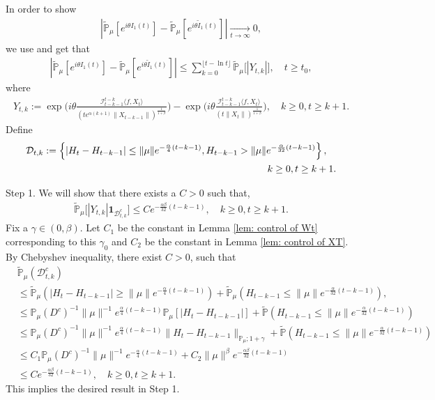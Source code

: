 \documentclass[12pt]{amsart}
\theoremstyle{plain}
\theoremstyle{definition}
\numberwithin{equation}{section}
\begin{document}
    In order to show
\begin{align}
    |\mathbb{\tilde{P}}_{\mu}[e^{i\theta I_1(t)}]-\mathbb{\tilde{P}}_{\mu}[e^{i\theta\tilde{I}_1(t)}]|
    \xrightarrow[t\to \infty]{} 0,
\end{align}
	we use \cite[Lemma 3.4.3.]{Durrett2010Probability} and get that
\begin{align}\label{ineq: control of I1t}
    |\mathbb{\tilde{P}}_{\mu}[e^{i\theta I_1(t)}] - \mathbb{\tilde{P}}_{\mu} [e^{i\theta\tilde{I}_1(t)}]|
    \leq \sum_{k=0}^{\lfloor t-\ln t \rfloor}\mathbb{\tilde{P}}_{\mu}\big[|Y_{t,k}|\big],
    \quad t\geq t_0,
\end{align}
    where
\begin{align*}
    Y_{t,k}
    :=\exp\Big(i\theta\frac{\mathcal I_{t-k-1}^{t-k}\langle f ,X_t\rangle}{(t e^{\alpha(k+1)}\|X_{t-k-1}\|)^{\frac{1}{1+\beta}}}\Big)-\exp\Big(i\theta\frac{\mathcal I_{t-k-1}^{t-k}\langle f ,X_t\rangle}{(t\|X_t\|)^{\frac{1}{1+\beta}}}\Big),
    \quad k \geq 0 , t\geq k+1.
\end{align*}
    Define
\begin{align}
\label{def: Dtk}
    \mathcal{D}_{t,k}&:=\left\{|H_t-H_{t-k-1}|\leq \|\mu\| e^{-\frac{\alpha}{4}(t-k-1)}, H_{t-k-1}>\|\mu\|e^{-\frac{\alpha}{32}(t-k-1)}\right\},
    \\ &&\mathllap{ k\geq 0, t\geq k+1.}
\end{align}

    Step 1. We will show that there exists a $C>0$ such that,
\begin{align}
\label{thm121}
    \mathbb{\tilde{P}}_{\mu}\big[|Y_{t,k}|\mathbf{1}_{\mathcal{D}^c_{t,k}}\big]
    \leq C e^{-\frac{\alpha\beta}{32}(t-k-1)},
    \quad k\geq 0, t\geq k+1.
\end{align}
    Fix a $\gamma \in (0,\beta)$.
    Let $C_1$ be the constant in  Lemma \ref{lem: control of Wt} corresponding to this $\gamma_0$ and $C_2$ be the constant in Lemma \ref{lem: control of XT}. 
    By Chebyshev inequality, there exist $C>0$, such that
\begin{align}
\label{eq: prob of Dtkc}
    &\mathbb{\tilde{P}}_{\mu}(\mathcal{D}_{t,k}^c)
    \\&\leq \mathbb{\tilde{P}}_{\mu}(|H_t-H_{t-k-1}|\geq \|\mu\| e^{-\frac{\alpha}{4}(t-k-1)})+\mathbb{\tilde{P}}_{\mu}(H_{t-k-1}\leq \|\mu\|e^{-\frac{\alpha}{32}(t-k-1)}),
    \\&\leq \mathbb{P}_{\mu}(D^c)^{-1}\|\mu\|^{-1}e^{\frac{\alpha}{4}(t-k-1)}\mathbb{P}_{\mu}[|H_t-H_{t-k-1}|]+\mathbb{\tilde{P}}(H_{t-k-1}\leq\|\mu\|e^{-\frac{\alpha}{32}(t-k-1)})
    \\&\leq \mathbb{P}_{\mu}(D^c)^{-1} \|\mu\|^{-1} e^{\frac{\alpha}{4}(t-k-1)}\|H_t - H_{t-k-1}\|_{\mathbb P_\mu; 1+\gamma}+\mathbb{\tilde{P}}(H_{t-k-1}\leq\|\mu\|e^{-\frac{\alpha}{32}(t-k-1)})
    \\&\leq C_1  \mathbb{P}_{\mu}(D^c)^{-1} \|\mu\|^{-1} e^{-\frac{\alpha}{4}(t-k-1)}+C_2\|\mu\|^{\beta}e^{-\frac{\alpha\beta}{32}(t-k-1)}
    \\&\leq Ce^{-\frac{\alpha\beta}{32}(t-k-1)},
    \quad k\geq 0, t\geq k+1.
\end{align}
    This implies the desired result in Step 1.
\end{document}
